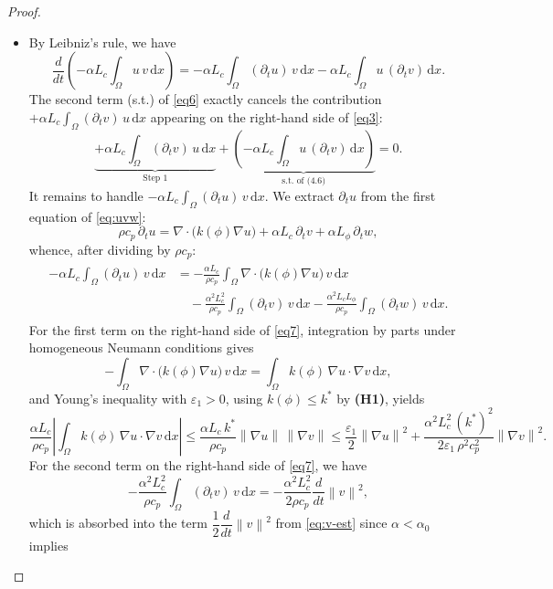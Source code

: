 \documentclass[final,1p,times]{elsarticle}
\newcommand{\dx}{\,\mathrm{d}x}
\numberwithin{equation}{section}
\newcommand{\norm}[1]{\left\|#1\right\|}
\newcommand{\abs}[1]{\left|#1\right|}
\newcommand{\ptn}{\partial_t}
\begin{document}
\begin{proof}
		\begin{itemize}
			\item[\textbf{(i)}]
			By Leibniz's rule, we have
			\begin{equation}
				\label{eq6}
				\frac{d}{dt}\!\left(-\alpha L_c\int_\Omega u\,v\dx\right)
				= -\alpha L_c\int_\Omega (\ptn u)\,v\dx
				-\alpha L_c\int_\Omega u\,(\ptn v)\dx.
			\end{equation}
			The second term (s.t.) of \eqref{eq6} exactly cancels the contribution
			$+\alpha L_c\int_\Omega (\ptn v)\,u\dx$ appearing on the right-hand side
			of \eqref{eq3}:
			\[
			\underbrace{+\alpha L_c\int_\Omega (\ptn v)\,u\dx}_{\text{Step 1}}
			+
			\underbrace{\left( -\alpha L_c\int_\Omega u\,(\ptn v)\dx \right) }_{\text{s.t. of (4.6)}} 
			= 0.
			\]
			It remains to handle $-\alpha L_c\int_\Omega (\ptn u)\,v\dx$.
			We extract $\ptn u$ from the first equation of \eqref{eq:uvw}:
			\[
			\rho c_p\,\ptn u
			= \nabla\cdot\bigl(k(\phi)\nabla u\bigr)
			+ \alpha L_c\,\ptn v
			+ \alpha L_\phi\,\ptn w,
			\]
			whence, after dividing by $\rho c_p$:
			\begin{align}
				\label{eq7}
				\begin{split}
					-\alpha L_c\int_\Omega (\ptn u)\,v\dx
					&= -\frac{\alpha L_c}{\rho c_p}
					\int_\Omega \nabla\cdot\bigl(k(\phi)\nabla u\bigr)\,v\dx \\
					&\quad
					-\frac{\alpha^2 L_c^2}{\rho c_p}
					\int_\Omega (\ptn v)\,v\dx
					-\frac{\alpha^2 L_c L_\phi}{\rho c_p}
					\int_\Omega (\ptn w)\,v\dx.
				\end{split}
			\end{align}
			For the first term on the right-hand side of \eqref{eq7}, integration by parts under homogeneous
			Neumann conditions gives
			\[
			-\int_\Omega \nabla\cdot\bigl(k(\phi)\nabla u\bigr)\,v\dx
			= \int_\Omega k(\phi)\,\nabla u\cdot\nabla v\dx,
			\]
			and Young's inequality with $\varepsilon_1 > 0$, using
			$k(\phi) \leq k^*$ by \textbf{(H1)}, yields
			\[
			\frac{\alpha L_c}{\rho c_p}
			\abs{\int_\Omega k(\phi)\,\nabla u\cdot\nabla v\dx}
			\leq
			\frac{\alpha L_c\, k^*}{\rho c_p}\norm{\nabla u}\,\norm{\nabla v}
			\leq
			\frac{\varepsilon_1}{2}\norm{\nabla u}^2
			+ \frac{\alpha^2 L_c^2\,(k^*)^2}{2\varepsilon_1\,\rho^2 c_p^2}\norm{\nabla v}^2.
			\]
			For the second term on the right-hand side of \eqref{eq7}, we have
			\[
			-\frac{\alpha^2 L_c^2}{\rho c_p}
			\int_\Omega (\ptn v)\,v\dx
			= -\frac{\alpha^2 L_c^2}{2\rho c_p}\frac{d}{dt}\norm{v}^2,
			\]
			which is absorbed into the term $\dfrac{1}{2}\dfrac{d}{dt}\norm{v}^2$ from \eqref{eq:v-est} since $\alpha < \alpha_0$ implies

\end{itemize}
\end{proof}
\end{document}
